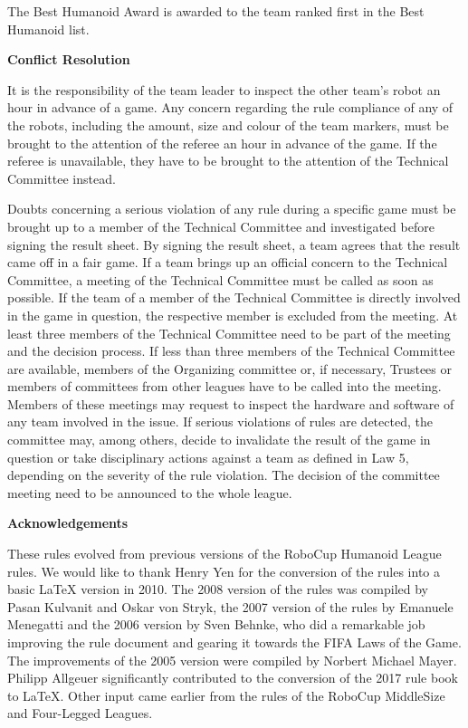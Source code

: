 \bigskip

The Best Humanoid Award is awarded to the team ranked first in the Best Humanoid list.

\bigskip

{\bfseries Conflict Resolution}

\headlinebox

It is the responsibility of the team leader to inspect the other team's robot an hour in advance of a game. Any concern regarding the rule compliance of any of the robots, including the amount, size and colour of the team markers, must be brought to the attention of the referee an hour in advance of the game. If the referee is unavailable, they have to be brought to the attention of the Technical Committee instead.

\bigskip

Doubts concerning a serious violation of any rule during a specific game must be brought up to a member of the Technical Committee and investigated before signing the result sheet. By signing the result sheet, a team agrees that the result came off in a fair game. If a team brings up an official concern to the Technical Committee, a meeting of the Technical Committee must be called as soon as possible. If the team of a member of the Technical Committee is directly involved in the game in question, the respective member is excluded from the meeting. At least three members of the Technical Committee need to be part of the meeting and the decision process. If less than three members of the Technical Committee are available, members of the Organizing committee or, if necessary, Trustees or members of committees from other leagues have to be called into the meeting. Members of these meetings may request to inspect the hardware and software of any team involved in the issue. If serious violations of rules are detected, the committee may, among others, decide to invalidate the result of the game in question or take disciplinary actions against a team as defined in Law 5, depending on the severity of the rule violation. The decision of the committee meeting need to be announced to the whole league.

{\bfseries Acknowledgements}

\headlinebox

These rules evolved from previous versions of the RoboCup Humanoid League rules. We would like to thank Henry Yen for the conversion of the rules into a basic LaTeX version in 2010. The 2008 version of the rules was compiled by Pasan Kulvanit and Oskar von Stryk, the 2007 version of the rules by Emanuele Menegatti and the 2006 version by Sven Behnke, who did a remarkable job improving the rule document and gearing it towards the FIFA Laws of the Game. The improvements of the 2005 version were compiled by Norbert Michael Mayer. Philipp Allgeuer significantly contributed to the conversion of the 2017 rule book to LaTeX.  Other input came earlier from the rules of the RoboCup MiddleSize and Four-Legged Leagues.

